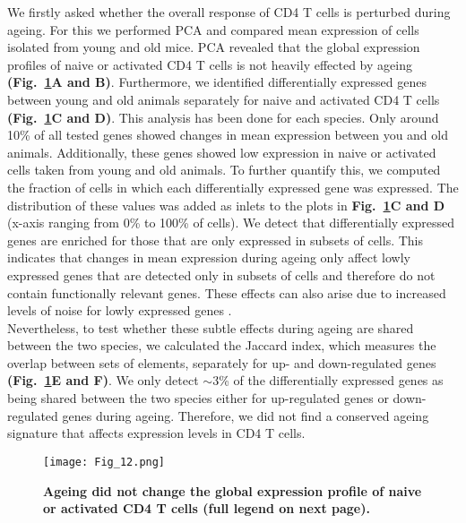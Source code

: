 We firstly asked whether the overall response of CD4\plus{} T cells is perturbed during ageing. For this we performed PCA and compared mean expression of cells isolated from young and old mice. PCA revealed that the global expression profiles of naive or activated CD4\plus{} T cells is not heavily effected by ageing \textbf{(Fig.~\ref{fig1:mean_expression_ageing}A and B)}. Furthermore, we identified differentially expressed genes between young and old animals separately for naive and activated CD4\plus{} T cells \textbf{(Fig.~\ref{fig1:mean_expression_ageing}C and D)}. This analysis has been done for each species. Only around 10\% of all tested genes showed changes in mean expression between you and old animals. Additionally, these genes showed low expression in naive or activated cells taken from young and old animals. To further quantify this, we computed the fraction of cells in which each differentially expressed gene was expressed. The distribution of these values was added as inlets to the plots in \textbf{Fig.~\ref{fig1:mean_expression_ageing}C and D} (x-axis ranging from 0\% to 100\% of cells). We detect that differentially expressed genes are enriched for those that are only expressed in subsets of cells. This indicates that changes in mean expression during ageing only affect lowly expressed genes that are detected only in subsets of cells and therefore do not contain functionally relevant genes. These effects can also arise due to increased levels of noise for lowly expressed genes \citep{Brennecke2013}. \\

Nevertheless, to test whether these subtle effects during ageing are shared between the two species, we calculated the Jaccard index, which measures the overlap between sets of elements, separately for up- and down-regulated genes \textbf{(Fig.~\ref{fig1:mean_expression_ageing}E and F)}. We only detect $\sim$3\% of the differentially expressed genes as being shared between the two species either for up-regulated genes or down-regulated genes during ageing. Therefore, we did not find a conserved ageing signature that affects expression levels in CD4\plus{} T cells.

\newpage

\begin{figure}[!ht]
\centering
\texttt{[image: Fig\_12.png]}
\caption[Global immune response during ageing]{\textbf{Ageing did not change the global expression profile of naive or activated CD4\plus{} T cells (full legend on next page).}}
\label{fig1:mean_expression_ageing}
\end{figure}


